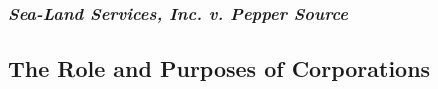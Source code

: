 \subsubsection{\emph{Sea-Land Services, Inc. v. Pepper Source}}


\subsection{The Role and Purposes of Corporations}


